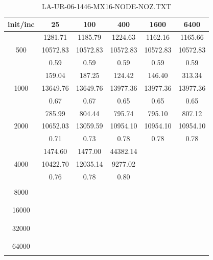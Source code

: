{\begin{table}[th]
\caption{LA-UR-06-1446-MX16-NODE-NOZ.TXT}
\label{tab:LA-UR-06-1446-MX16-NODE-NOZ.TXT}
\centering
\begin{tabular}{|c||c|c|c|c|c|}
\hline
init/inc & 25 & 100 & 400 & 1600 & 6400 \\ \hline \hline
  & 1281.71 & 1185.79 & 1224.63 & 1162.16 & 1165.66\\ 
500  & 10572.83 & 10572.83 & 10572.83 & 10572.83 & 10572.83\\ 
  & 0.59 & 0.59 & 0.59 & 0.59 & 0.59\\ \hline 
  & 159.04 & 187.25 & 124.42 & 146.40 & 313.34\\ 
1000  & 13649.76 & 13649.76 & 13977.36 & 13977.36 & 13977.36\\ 
  & 0.67 & 0.67 & 0.65 & 0.65 & 0.65\\ \hline 
  & 785.99 & 804.44 & 795.74 & 795.10 & 807.12\\ 
2000  & 10652.03 & 13059.59 & 10954.10 & 10954.10 & 10954.10\\ 
  & 0.71 & 0.73 & 0.78 & 0.78 & 0.78\\ \hline 
  & 1474.60 & 1477.00 & 44382.14 &  & \\ 
4000  & 10422.70 & 12035.14 & 9277.02 &  & \\ 
  & 0.76 & 0.78 & 0.80 &  & \\ \hline 
  &  &  &  &  & \\ 
8000  &  &  &  &  & \\ 
  &  &  &  &  & \\ \hline 
  &  &  &  &  & \\ 
16000  &  &  &  &  & \\ 
  &  &  &  &  & \\ \hline 
  &  &  &  &  & \\ 
32000  &  &  &  &  & \\ 
  &  &  &  &  & \\ \hline 
  &  &  &  &  & \\ 
64000  &  &  &  &  & \\ 
  &  &  &  &  & \\ \hline 
\end{tabular}
\end{table}

}
